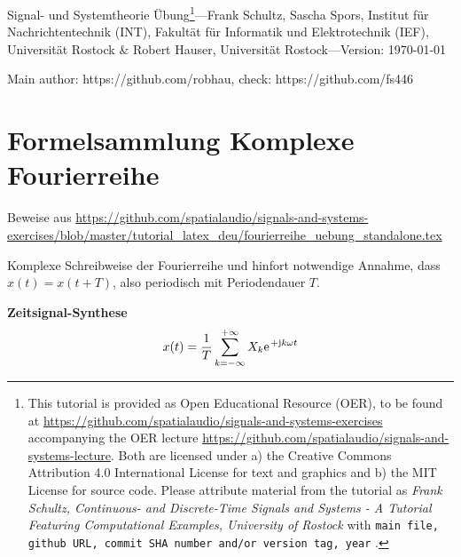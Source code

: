 \documentclass[11pt,a4paper,DIV=12]{scrartcl}
\begin{document}
\noindent Signal- und Systemtheorie Übung\footnote{This tutorial is provided as
Open Educational Resource (OER), to be found at
\url{https://github.com/spatialaudio/signals-and-systems-exercises}
accompanying the OER lecture
\url{https://github.com/spatialaudio/signals-and-systems-lecture}.
%
Both are licensed under a) the Creative Commons Attribution 4.0 International
License for text and graphics and b) the MIT License for source code.
%
Please attribute material from the tutorial as \textit{Frank Schultz,
Continuous- and Discrete-Time Signals and Systems - A Tutorial Featuring
Computational Examples, University of Rostock} with
\texttt{main file, github URL, commit SHA number and/or version tag, year}
.}---Frank Schultz, Sascha Spors,
Institut für Nachrichtentechnik (INT),
Fakultät für Informatik und Elektrotechnik (IEF),
Universität Rostock \&
Robert Hauser, Universität Rostock---Version: \today
%

\noindent Main author: https://github.com/robhau, check: https://github.com/fs446

\section*{Formelsammlung Komplexe Fourierreihe}
%
Beweise aus \url{https://github.com/spatialaudio/signals-and-systems-exercises/blob/master/tutorial_latex_deu/fourierreihe_uebung_standalone.tex}
%

\noindent Komplexe Schreibweise der Fourierreihe und hinfort notwendige Annahme,
dass $x(t) = x(t+T)$, also periodisch mit Periodendauer $T$.

\textbf{Zeitsignal-Synthese}
\begin{align}
	x(t)=\frac{1}{T}\sum_{k=-\infty}^{+\infty}X_k\e^{+\im k \omega t}
\end{align}
\end{document}
